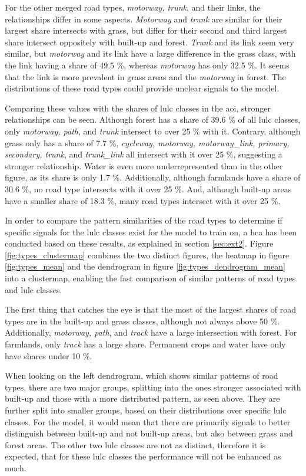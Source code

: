 For the other merged road types, \emph{motorway, trunk}, and their links, the relationships differ in some aspects. \emph{Motorway} and \emph{trunk} are similar for their largest share intersects with grass, but differ for their second and third largest share intersect oppositely with built-up and forest. \emph{Trunk} and its link seem very similar, but \emph{motorway} and its link have a large difference in the grass class, with the link having a share of 49.5 \%, whereas \emph{motorway} has only 32.5 \%. It seems that the link is more prevalent in grass areas and the \emph{motorway} in forest. The distributions of these road types could provide unclear signals to the model.

Comparing these values with the shares of \gls{lulc} classes in the \gls{aoi}, stronger relationships can be seen. Although forest has a share of 39.6 \% of all \gls{lulc} classes, only \emph{motorway, path}, and \emph{trunk} intersect to over 25 \% with it. Contrary, although grass only has a share of 7.7 \%, \emph{cycleway, motorway, motorway\_link, primary, secondary, trunk}, and \emph{trunk\_link} all intersect with it over 25 \%, suggesting a stronger relationship. Water is even more underrepresented than in the other figure, as its share is only 1.7 \%. Additionally, although farmlands have a share of 30.6 \%, no road type intersects with it over 25 \%. And, although built-up areas have a smaller share of 18.3 \%, many road types intersect with it over 25 \%.

In order to compare the pattern similarities of the road types to determine if specific signals for the \gls{lulc} classes exist for the model to train on, a \gls{hca} has been conducted based on these results, as explained in section \ref{sec:ext2}. Figure \ref{fig:types_clustermap} combines the two distinct figures, the heatmap in figure \ref{fig:types_mean} and the dendrogram in figure \ref{fig:types_dendrogram_mean} into a clustermap, enabling the fast comparison of similar patterns of road types and \gls{lulc} classes.

The first thing that catches the eye is that the most of the largest shares of road types are in the built-up and grass classes, although not always above 50 \%. Additionally, \emph{motorway, path}, and \emph{track} have a large intersection with forest. For farmlands, only \emph{track} has a large share. Permanent crops and water have only have shares under 10 \%.

When looking on the left dendrogram, which shows similar patterns of road types, there are two major groups, splitting into the ones stronger associated with built-up and those with a more distributed pattern, as seen above. They are further split into smaller groups, based on their distributions over specific \gls{lulc} classes. For the model, it would mean that there are primarily signals to better distinguish between built-up and not built-up areas, but also between grass and forest areas. The other two \gls{lulc} classes are not as distinct, therefore it is expected, that for these \gls{lulc} classes the performance will not be enhanced as much.

